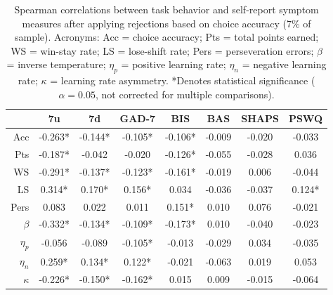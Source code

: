 \documentclass[a4paper,notitlepage,12pt]{article}
\begin{document}
\begin{table}[h!]
\centering
\small
\begin{tabular}{rccccccc}
\toprule
{} &       7u &       7d &    GAD-7 &      BIS &     BAS &   SHAPS &    PSWQ \\
\midrule
Acc      &  -0.263* &  -0.144* &  -0.105* &  -0.106* &  -0.009 &  -0.020 &  -0.033 \\
Pts      &  -0.187* &   -0.042 &   -0.020 &  -0.126* &  -0.055 &  -0.028 &   0.036 \\
WS       &  -0.291* &  -0.137* &  -0.123* &  -0.161* &  -0.019 &   0.006 &  -0.044 \\
LS       &   0.314* &   0.170* &   0.156* &    0.034 &  -0.036 &  -0.037 &  0.124* \\
Pers     &    0.083 &    0.022 &    0.011 &   0.151* &   0.010 &   0.076 &  -0.021 \\
$\beta$  &  -0.332* &  -0.134* &  -0.109* &  -0.173* &   0.010 &  -0.040 &  -0.023 \\
$\eta_p$ &   -0.056 &   -0.089 &  -0.105* &   -0.013 &  -0.029 &   0.034 &  -0.035 \\
$\eta_n$ &   0.259* &   0.134* &   0.122* &   -0.021 &  -0.063 &   0.019 &   0.053 \\
$\kappa$ &  -0.226* &  -0.150* &  -0.162* &    0.015 &   0.009 &  -0.015 &  -0.064 \\
\bottomrule
\end{tabular}
\captionsetup{width=0.88\textwidth}
\caption{Spearman correlations between task behavior and self-report symptom measures after applying rejections based on choice accuracy (7\% of sample). Acronyms: Acc = choice accuracy; Pts = total points earned; WS = win-stay rate; LS = lose-shift rate; Pers = perseveration errors; $\beta$ = inverse temperature; $\eta_p$ = positive learning rate; $\eta_n$ = negative learning rate; $\kappa$ = learning rate asymmetry. *Denotes statistical significance ($\alpha=0.05$, not corrected for multiple comparisons).}
\end{table}
\end{document}
